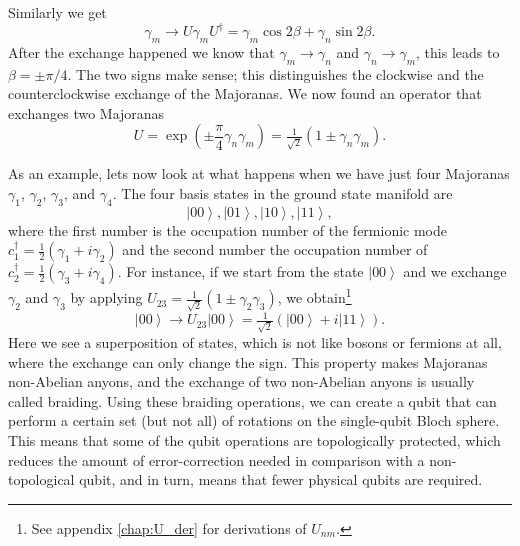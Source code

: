 Similarly we get
\begin{equation}
\gamma_{m}\to U\gamma_{m}U^{\dagger}=\gamma_{m}\cos2\beta+\gamma_{n}\sin2\beta.
\end{equation}
After the exchange happened we know that $\gamma_{m}\to\gamma_{n}$ and $\gamma_{n}\to\gamma_{m}$, this leads to $\beta=\pm\pi/4$.
The two signs make sense; this distinguishes the clockwise and the counterclockwise exchange of the Majoranas.
We now found an operator that exchanges two Majoranas
\begin{equation}
U=\exp\left(\pm\frac{\pi}{4}\gamma_{n}\gamma_{m}\right)=\tfrac{1}{\sqrt{2}}\left(1\pm\gamma_{n}\gamma_{m}\right).\label{eq:U_nm}
\end{equation}

As an example, lets now look at what happens when we have just four Majoranas $\gamma_{1}$, $\gamma_{2}$, $\gamma_{3}$, and $\gamma_{4}$.
The four basis states in the ground state manifold are
\begin{equation}
\left|00\right\rangle ,\left|01\right\rangle ,\left|10\right\rangle ,\left|11\right\rangle ,\label{eq:basis}
\end{equation}
where the first number is the occupation number of the fermionic mode $c_{1}^{\dagger}=\tfrac{1}{2}(\gamma_{1}+i\gamma_{2})$ and the second number the occupation number of $c_{2}^{\dagger}=\tfrac{1}{2}(\gamma_{3}+i\gamma_{4})$.
For instance, if we start from the state $\left|00\right\rangle $ and we exchange $\gamma_{2}$ and $\gamma_{3}$ by applying $U_{23}=\tfrac{1}{\sqrt{2}}\left(1\pm\gamma_{2}\gamma_{3}\right)$, we obtain\footnote{See appendix \ref{chap:U_der} for derivations of $U_{nm}$.}  %
\begin{equation}
\left|00\right\rangle \to U_{23}\left|00\right\rangle =\tfrac{1}{\sqrt{2}}\left(\left|00\right\rangle +i\left|11\right\rangle \right).
\end{equation}
Here we see a superposition of states, which is not like bosons or fermions at all, where the exchange can only change the sign.
This property makes Majoranas non-Abelian anyons, and the exchange of two non-Abelian anyons is usually called braiding.
Using these braiding operations, we can create a qubit that can perform a certain set (but not all) of rotations on the single-qubit Bloch sphere.
This means that some of the qubit operations are topologically protected, which reduces the amount of error-correction needed in comparison with a non-topological qubit, and in turn, means that fewer physical qubits are required.



